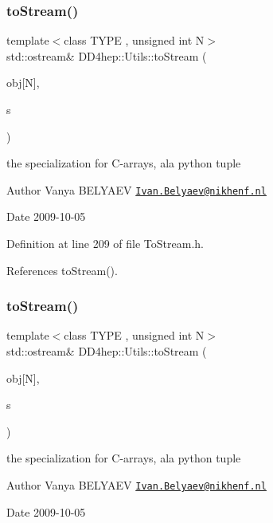 \subsubsection{\texorpdfstring{to\+Stream()}{toStream()}\hspace{0.1cm}{\footnotesize\ttfamily [14/22]}}
{\footnotesize\ttfamily template$<$class T\+Y\+PE , unsigned int N$>$ \\
std\+::ostream\& D\+D4hep\+::\+Utils\+::to\+Stream (\begin{DoxyParamCaption}\item[{T\+Y\+PE(\&)}]{obj\mbox{[}\+N\mbox{]},  }\item[{std\+::ostream \&}]{s }\end{DoxyParamCaption})}

the specialization for C-\/arrays, a\textquotesingle{}la python tuple \begin{DoxyAuthor}{Author}
Vanya B\+E\+L\+Y\+A\+EV \href{mailto:Ivan.Belyaev@nikhenf.nl}{\tt Ivan.\+Belyaev@nikhenf.\+nl} 
\end{DoxyAuthor}
\begin{DoxyDate}{Date}
2009-\/10-\/05 
\end{DoxyDate}


Definition at line 209 of file To\+Stream.\+h.



References to\+Stream().

\hypertarget{namespace_d_d4hep_1_1_utils_a6fd757ad84b1cf53481c6c4bd48f26c0}{}\label{namespace_d_d4hep_1_1_utils_a6fd757ad84b1cf53481c6c4bd48f26c0} 
\subsubsection{\texorpdfstring{to\+Stream()}{toStream()}\hspace{0.1cm}{\footnotesize\ttfamily [15/22]}}
{\footnotesize\ttfamily template$<$class T\+Y\+PE , unsigned int N$>$ \\
std\+::ostream\& D\+D4hep\+::\+Utils\+::to\+Stream (\begin{DoxyParamCaption}\item[{const T\+Y\+PE(\&)}]{obj\mbox{[}\+N\mbox{]},  }\item[{std\+::ostream \&}]{s }\end{DoxyParamCaption})}

the specialization for C-\/arrays, a\textquotesingle{}la python tuple \begin{DoxyAuthor}{Author}
Vanya B\+E\+L\+Y\+A\+EV \href{mailto:Ivan.Belyaev@nikhenf.nl}{\tt Ivan.\+Belyaev@nikhenf.\+nl} 
\end{DoxyAuthor}
\begin{DoxyDate}{Date}
2009-\/10-\/05 
\end{DoxyDate}


